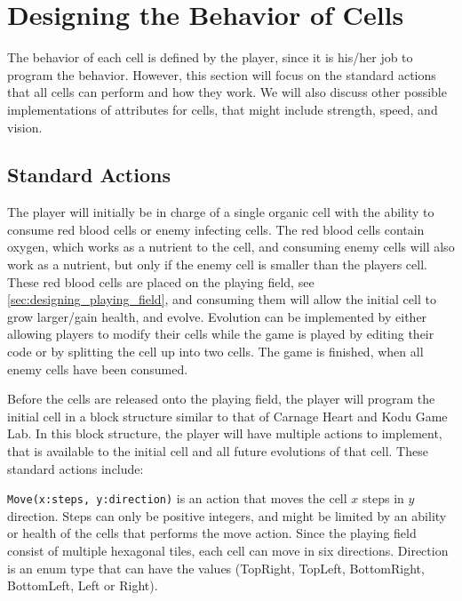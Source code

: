 \section{Designing the Behavior of Cells}
\label{sec:designingBehaviorCells}
The behavior of each cell is defined by the player, since it is his/her job to program the behavior. However, this section will focus on the standard actions that all cells can perform and how they work. We will also discuss other possible implementations of attributes for cells, that might include strength, speed, and vision.

\subsection{Standard Actions}

The player will initially be in charge of a single organic cell with the ability to consume red blood cells or enemy infecting cells.
The red blood cells contain oxygen, which works as a nutrient to the cell, and consuming enemy cells will also work as a nutrient, but only if the enemy cell is smaller than the players cell.
These red blood cells are placed on the playing field, see \autoref{sec:designing_playing_field}, and consuming them will allow the initial cell to grow larger/gain health, and evolve.
Evolution can be implemented by either allowing players to modify their cells while the game is played by editing their code or by splitting the cell up into two cells.
The game is finished, when all enemy cells have been consumed.\newline

Before the cells are released onto the playing field, the player will program the initial cell in a block structure similar to that of Carnage Heart and Kodu Game Lab.
In this block structure, the player will have multiple actions to implement, that is available to the initial cell and all future evolutions of that cell.
These standard actions include:\newline

\verb|Move(x:steps, y:direction)| is an action that moves the cell $x$ steps in $y$ direction.
Steps can only be positive integers, and might be limited by an ability or health of the cells that performs the move action.
Since the playing field consist of multiple hexagonal tiles, each cell can move in six directions.
Direction is an enum type that can have the values (TopRight, TopLeft, BottomRight, BottomLeft, Left or Right).\newline

